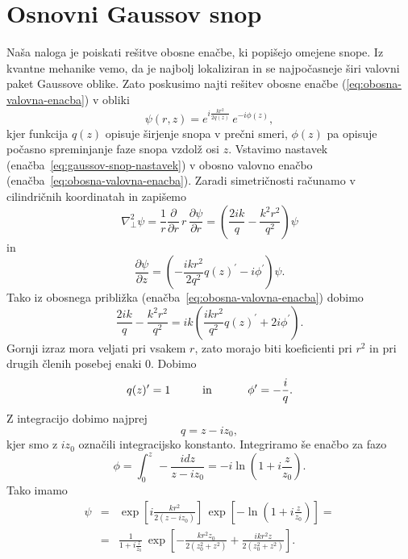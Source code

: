 \section{Osnovni Gaussov snop}
Naša naloga je poiskati rešitve obosne enačbe, ki popišejo omejene
snope. Iz kvantne mehanike vemo, da je najbolj lokaliziran in se najpočasneje
širi valovni paket Gaussove oblike. Zato poskusimo najti rešitev obosne
enačbe (\ref{eq:obosna-valovna-enacba}) v obliki 
\begin{equation}
\psi(r,z)=e^{i\frac{kr^{2}}{2q(z)}}\, e^{-i\phi(z)},\label{eq:gaussov-snop-nastavek}
\end{equation}
kjer funkcija $q(z)$ opisuje širjenje snopa v prečni smeri,
$\phi(z)$ pa opisuje počasno spreminjanje faze snopa vzdolž osi $z$.
Vstavimo nastavek (enačba~\ref{eq:gaussov-snop-nastavek}) v obosno valovno enačbo 
(enačba~\ref{eq:obosna-valovna-enacba}).
Zaradi simetričnosti računamo v cilindričnih koordinatah in zapišemo
\begin{equation}
\nabla_{\perp}^{2}\psi=\frac{1}{r}\frac{\partial}{\partial r}\, r\,\frac{\partial\psi}{\partial r}=
\left( \frac{2ik}{q}-\frac{k^2r^2}{q^2}\right)\psi
\end{equation}
 in 
\begin{equation}
\frac{\partial\psi}{\partial z}=\left(-\frac{ikr^{2}}{2q^2}q(z)^{\prime}-i\phi^{\prime}\right)\psi.
\end{equation}
Tako iz obosnega približka (enačba~\ref{eq:obosna-valovna-enacba}) dobimo
\begin{equation}
\frac{2ik}{q}-\frac{k^2r^2}{q^2}=ik\left(\frac{ikr^{2}}{q^2}q(z)^{\prime}+2i\phi^{\prime}\right).
\end{equation}
Gornji izraz mora veljati pri vsakem $r$, zato morajo biti koeficienti
pri $r^{2}$ in pri drugih členih posebej enaki 0. Dobimo
\begin{equation}
q(z)^{\prime}=1\mbox{\hskip1cm in \hskip1cm}\phi^{\prime}=-\frac{i}{q}.
\end{equation}
 Z integracijo dobimo najprej 
\begin{equation}
q=z-iz_{0},
\label{eq:alpha}
\end{equation}
kjer smo z $i z_{0}$ označili integracijsko konstanto. 
Integriramo še enačbo za fazo 
\begin{equation}
\phi=\int_{0}^{z}\,-\frac{i dz}{z-iz_{0}}=-i\ln(1+i\frac{z}{z_{0}}).
\end{equation}
Tako imamo 
\begin{eqnarray}
\psi & = & \exp\left[i\frac{kr^{2}}{2(z-iz_0)}\right]\,\exp\left[-\ln(1+i\frac{z}{z_{0}})\right]=
\nonumber \\
 & = & \frac{1}{1+i\frac{z}{z_{0}}}\,\exp\left[-\frac{kr^{2}z_{0}}{2(z_{0}^{2}+z^{2})}+
 \frac{ikr^{2}z}{2(z_{0}^{2}+z^{2})}\right].
 \label{eq:gaussov-snop-vmesni}
\end{eqnarray}
